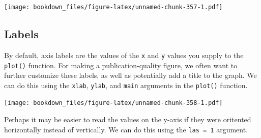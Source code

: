 \documentclass[
]{krantz}
\makeatletter
\newenvironment{Shaded}{\begin{snugshade}}{\end{snugshade}}
\newcommand{\DataTypeTok}[1]{\textcolor[rgb]{0.27,0.27,0.27}{#1}}
\newcommand{\DecValTok}[1]{\textcolor[rgb]{0.06,0.06,0.06}{#1}}
\newcommand{\KeywordTok}[1]{\textcolor[rgb]{0.27,0.27,0.27}{\textbf{#1}}}
\newcommand{\NormalTok}[1]{#1}
\newcommand{\OperatorTok}[1]{\textcolor[rgb]{0.43,0.43,0.43}{\textbf{#1}}}
\newcommand{\StringTok}[1]{\textcolor[rgb]{0.5,0.5,0.5}{#1}}
\newenvironment{kframe}{%
\medskip{}
\setlength{\fboxsep}{.8em}
 \def\at@end@of@kframe{}%
 \ifinner\ifhmode%
  \def\at@end@of@kframe{\end{minipage}}%
  \begin{minipage}{\columnwidth}%
 \fi\fi%
 \def\FrameCommand##1{\hskip\@totalleftmargin \hskip-\fboxsep
 \colorbox{shadecolor}{##1}\hskip-\fboxsep
     \hskip-\linewidth \hskip-\@totalleftmargin \hskip\columnwidth}%
 \MakeFramed {\advance\hsize-\width
   \@totalleftmargin\z@ \linewidth\hsize
   \@setminipage}}%
 {\par\unskip\endMakeFramed%
 \at@end@of@kframe}
\renewenvironment{Shaded}{\begin{kframe}}{\end{kframe}}
\makeatother
\begin{document}
\begin{Shaded}
\end{Shaded}

\texttt{[image: bookdown\_files/figure-latex/unnamed-chunk-357-1.pdf]}

\hypertarget{labels-1}{%
\subsection{Labels}\label{labels-1}}

By default, axis labels are the values of the \texttt{x} and \texttt{y} values you supply to the \texttt{plot()} function. For making a publication-quality figure, we often want to further customize these labels, as well as potentially add a title to the graph. We can do this using the \texttt{xlab}, \texttt{ylab}, and \texttt{main} arguments in the \texttt{plot()} function.

\begin{Shaded}
\end{Shaded}

\texttt{[image: bookdown\_files/figure-latex/unnamed-chunk-358-1.pdf]}

Perhaps it may be easier to read the values on the y-axis if they were oritented horizontally instead of vertically. We can do this using the \texttt{las\ =\ 1} argument.
\end{document}
